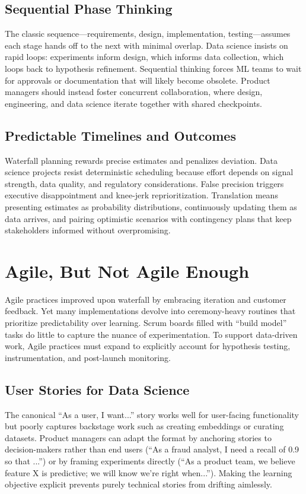 \subsection{Sequential Phase Thinking}
The classic sequence—requirements, design, implementation, testing—assumes each stage hands off to the next with minimal overlap. Data science insists on rapid loops: experiments inform design, which informs data collection, which loops back to hypothesis refinement. Sequential thinking forces ML teams to wait for approvals or documentation that will likely become obsolete. Product managers should instead foster concurrent collaboration, where design, engineering, and data science iterate together with shared checkpoints.

\subsection{Predictable Timelines and Outcomes}
Waterfall planning rewards precise estimates and penalizes deviation. Data science projects resist deterministic scheduling because effort depends on signal strength, data quality, and regulatory considerations. False precision triggers executive disappointment and knee-jerk reprioritization. Translation means presenting estimates as probability distributions, continuously updating them as data arrives, and pairing optimistic scenarios with contingency plans that keep stakeholders informed without overpromising.

\section{Agile, But Not Agile Enough}
\label{sec:agile-limitations}

Agile practices improved upon waterfall by embracing iteration and customer feedback. Yet many implementations devolve into ceremony-heavy routines that prioritize predictability over learning. Scrum boards filled with ``build model'' tasks do little to capture the nuance of experimentation. To support data-driven work, Agile practices must expand to explicitly account for hypothesis testing, instrumentation, and post-launch monitoring.

\subsection{User Stories for Data Science}
The canonical ``As a user, I want...'' story works well for user-facing functionality but poorly captures backstage work such as creating embeddings or curating datasets. Product managers can adapt the format by anchoring stories to decision-makers rather than end users (``As a fraud analyst, I need a recall of 0.9 so that ...'') or by framing experiments directly (``As a product team, we believe feature X is predictive; we will know we're right when...''). Making the learning objective explicit prevents purely technical stories from drifting aimlessly.

